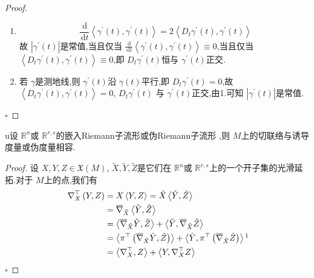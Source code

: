 \documentclass[../../几何与拓扑.tex]{subfiles}
\begin{document}
\begin{proof}
   \begin{enumerate}
    \item  \[
        \frac{\,\mathrm{d}  }{\,\mathrm{d} t }\left< \gamma ^{\prime} \left( t \right), \gamma ^{\prime} \left( t \right)   \right>= 2\left<D_{t} \gamma ^{\prime} \left( t \right), \gamma ^{\prime} \left( t \right)   \right> 
        \]故 \(  \left|  \gamma ^{\prime} \left( t \right)  \right|   \)是常值,当且仅当 \(  \frac{\,\mathrm{d}  }{\,\mathrm{d} t } \left< \gamma ^{\prime} \left( t \right), \gamma ^{\prime} \left( t \right)   \right>\equiv 0   \),当且仅当 \(  \left<D_{t} \gamma ^{\prime} \left( t \right), \gamma ^{\prime} \left( t \right)   \right>\equiv 0  \),即 \(  D_{t} \gamma ^{\prime} \left( t \right)   \)恒与 \(   \gamma ^{\prime} \left( t \right)   \)正交.
        \item 若 \(   \gamma   \)是测地线,则  \(   \gamma ^{\prime} \left( t \right)   \)沿 \(   \gamma \left( t \right)   \)平行,即 \(  D_{t} \gamma ^{\prime} \left( t \right)= 0   \),故 \(  \left<D_{t} \gamma ^{\prime} \left( t \right), \gamma ^{\prime} \left( t \right)   \right>= 0  \), \(  D_{t} \gamma ^{\prime} \left( t \right)   \)      与 \(   \gamma ^{\prime} \left( t \right)   \)正交,由1.可知 \(  \left|  \gamma ^{\prime} \left( t \right)  \right|   \)是常值.   
   \end{enumerate}
        

    \hfill $\square$
\end{proof}

\begin{proposition}\label{切联络的度量性}
   u设  \(  \mathbb{R} ^{n}  \)或 \(  \mathbb{R} ^{r,s}  \)的嵌入Riemann子流形或伪Riemann子流形   ,则 \(  M  \)上的切联络与诱导度量或伪度量相容. 
\end{proposition}

\begin{proof}
    设 \(  X,Y,Z \in \mathfrak{X}\left( M \right)   \), \(  \tilde{X},\tilde{Y},\tilde{Z}  \)是它们在 \(  \mathbb{R} ^{n}  \)或 \(  \mathbb{R} ^{r,s}  \)上的一个开子集的光滑延拓.对于 \(  M  \)上的点,我们有 \[
    \begin{aligned}
     \nabla ^{\top}_{X}\left( Y,Z \right)& =  X\left<Y,Z \right> =  \tilde{X}\left<\tilde{Y},\tilde{Z} \right>\\ 
      & =  \overline{ \nabla} _{\tilde{X}}\left<\tilde{Y},\tilde{Z} \right>\\ 
       & =    \left<\overline{ \nabla }_{\tilde{X}}\tilde{Y},\tilde{Z} \right>+  \left<\tilde{Y}, \overline{ \nabla }_{\tilde{X}}\tilde{Z} \right> \\ 
        & = \left<\pi ^{\top}\left( \overline{ \nabla }_{\tilde{X}}\tilde{Y},\tilde{Z} \right)  \right>+ \left<\tilde{Y},\pi ^{\top}\left( \overline{ \nabla }_{\tilde{X}} \tilde{Z} \right)  \right>\footnotemark \\ 
         & =  \left< \nabla _{X}^{\top} ,Z\right>+  \left<Y,  \nabla _{X}^{\top}Z \right>
    \end{aligned}
    \]     
    \hfill $\square$
\end{proof}
\end{document}
